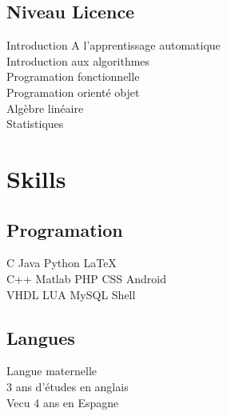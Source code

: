 \documentclass[letterpaper]{deedy-resume} %
\begin{document}
\begin{minipage}[t]{0.33\textwidth}
\subsection{Niveau Licence}

Introduction A l'apprentissage automatique \\
Introduction aux algorithmes \\
Programation fonctionnelle \\
Programation orienté objet \\
Algèbre linéaire \\
Statistiques \\

\sectionspace %


\section{Skills}
\subsection{Programation}

C  \textbullet{} Java \textbullet{} Python \textbullet{} \LaTeX\ \\ 
C++ \textbullet{} Matlab \textbullet{} PHP \textbullet{} CSS \textbullet{} Android\\
VHDL \textbullet{} LUA \textbullet{} MySQL \textbullet{} Shell



\sectionspace %

\subsection{Langues}

Langue maternelle\\
3 ans d'études en anglais\\
Vecu 4 ans en Espagne

\sectionspace %



\end{minipage}
\end{document}
